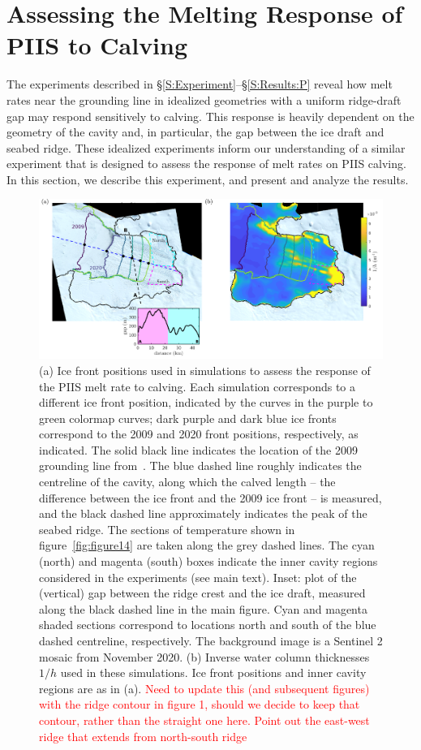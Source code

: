 \documentclass[draft]{agujournal2019}
\newcommand{\red}[1]{\textcolor{red}{#1}}
\begin{document}
\section{Assessing the Melting Response of PIIS to Calving}\label{S:Realistic}
The experiments described in \S\ref{S:Experiment}--\S\ref{S:Results:P} reveal how melt rates near the grounding line in idealized geometries with a uniform ridge-draft gap may respond sensitively to calving. This response is heavily dependent on the geometry of the cavity and, in particular, the gap between the ice draft and seabed ridge. These idealized experiments inform our understanding of a similar experiment that is designed to assess the response of melt rates on PIIS calving. In this section, we describe this experiment, and present and analyze the results.

\begin{figure}
    \centering
    \includegraphics[width =\textwidth]{../make_figures/plots/figure10_combined.pdf}
    \caption{(a) Ice front positions used in simulations to assess the response of the PIIS melt rate to calving. Each simulation corresponds to a different ice front position, indicated by the curves in the purple to green colormap curves; dark purple and dark blue ice fronts correspond to the 2009 and 2020 front positions, respectively, as indicated. The solid black line indicates the location of the 2009 grounding line from~. The blue dashed line roughly indicates the centreline of the cavity, along which the calved length -- the difference between the ice front and the 2009 ice front -- is measured, and the black dashed line approximately indicates the peak of the seabed ridge. The sections of temperature shown in figure~\ref{fig:figure14} are taken along the grey dashed lines. The cyan (north) and magenta (south) boxes indicate the inner cavity regions considered in the experiments (see main text). Inset: plot of the (vertical) gap between the ridge crest and the ice draft, measured along the black dashed line in the main figure. Cyan and magenta shaded sections correspond to locations north and south of the blue dashed centreline, respectively. The background image is a Sentinel 2 mosaic from November 2020. (b) Inverse water column thicknesses $1/h$ used in these simulations. Ice front positions and inner cavity regions are as in (a). \red{Need to update this (and subsequent figures) with the ridge contour in figure 1, should we decide to keep that contour, rather than the straight one here. Point out the east-west ridge that extends from north-south ridge}}
    \label{fig:figure10}
\end{figure}
\end{document}
